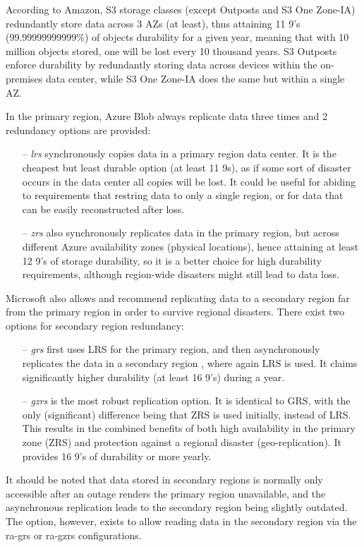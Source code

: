 According to Amazon, S3 storage classes (except Outposts and S3 One Zone-IA) redundantly store data across 3 AZs (at least), thus attaining 11 9's (99.99999999999\%) of objects durability for a given year, meaning that with 10 million objects stored, one will be lost every 10 thousand years. S3 Outposts enforce durability by redundantly storing data across devices within the on-premises data center, while S3 One Zone-IA does the same but within a single AZ.

\bigskip
In the primary region, Azure Blob always replicate data three times and 2 redundancy options are provided: ~\cite{blobinfo}
\begin{itemize}
    \item [--] \textit{\ac{lrs}} synchronously copies data in a primary region data center. It is the cheapest but least durable option (at least 11 9s), as if some sort of disaster occurs in the data center all copies will be lost. It could be useful for abiding to requirements that restring data to only a single region, or for data that can be easily reconstructed after loss.

    \item[--] \textit{\ac{zrs}} also synchronously replicates data in the primary region, but across different Azure availability zones (physical locations), hence attaining at least 12 9's of storage durability, so it is a better choice for high durability requirements, although region-wide disasters might still lead to data loss.
\end{itemize}

Microsoft also allows and recommend replicating data to a secondary region far from the primary region in order to survive regional disasters. There exist two options for secondary region redundancy:
\begin{itemize}
    \item [--]  \textit{\ac{grs}} first uses LRS for the primary region, and then asynchronously replicates the data in a secondary region , where again LRS is used. It claims significantly higher durability (at least 16 9's) during a year.

    \item [--] \textit{\ac{gzrs}} is the most robust replication option. It is identical to GRS, with the only (significant) difference being that ZRS is used initially, instead of LRS. This results in the combined benefits of both high availability in the primary zone (ZRS) and protection against a regional disaster (geo-replication). It provides 16 9's of durability or more yearly.
\end{itemize}
It should be noted that data stored in secondary regions is normally only accessible after an outage renders the primary region unavailable, and the asynchronous replication leads to the secondary region being slightly outdated. The option, however, exists to allow reading data in the secondary region via the \ac{ra-grs} or \ac{ra-gzrs} configurations.

